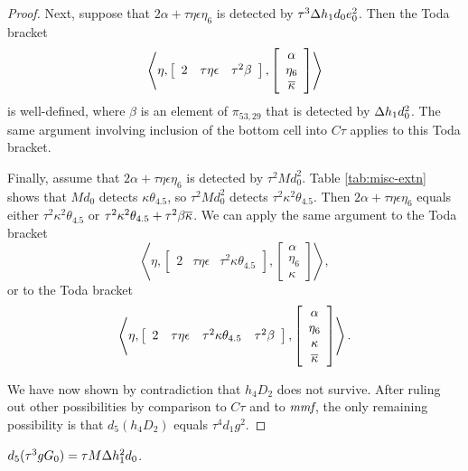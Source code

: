 \begin{proof}
Next, suppose that $2 \alpha + \tau \eta \epsilon \eta_6$
is detected by $\tau^3 \Delta h_1 d_0 e_0^2$.
Then the Toda bracket
\[
\left\langle
\eta,
\left[
\begin{array}{ccc}
2 & \tau \eta \epsilon & \tau^2 \beta
\end{array}
\right],
\left[
\begin{array}{c}
\alpha \\ \eta_6 \\ \overline{\kappa}
\end{array}
\right]
\right\rangle
\]
is well-defined, where $\beta$ is an element of $\pi_{53,29}$
that is detected by $\Delta h_1 d_0^2$.
The same argument involving inclusion of the bottom cell into
$C\tau$ applies to this Toda bracket.

Finally, assume that $2 \alpha + \tau \eta \epsilon \eta_6$
is detected by $\tau^2 M d_0^2$.
Table \ref{tab:misc-extn} shows that $M d_0$ detects
$\kappa \theta_{4.5}$, so $\tau^2 M d_0^2$ detects 
$\tau^2 \kappa^2 \theta_{4.5}$.
Then $2 \alpha + \tau \eta \epsilon \eta_6$ equals either
$\tau^2 \kappa^2 \theta_{4.5}$ or 
$\tau^2 \kappa^2 \theta_{4.5} + \tau^2 \beta \overline{\kappa}$.
We can apply the same argument to the Toda bracket
\[
\left\langle
\eta,
\left[
\begin{array}{ccc}
2 & \tau \eta \epsilon & \tau^2 \kappa \theta_{4.5}
\end{array}
\right],
\left[
\begin{array}{c}
\alpha \\ \eta_6 \\ \kappa
\end{array}
\right]
\right\rangle,
\]
or to the Toda bracket
\[
\left\langle
\eta,
\left[
\begin{array}{cccc}
2 & \tau \eta \epsilon & \tau^2 \kappa \theta_{4.5} & \tau^2 \beta
\end{array}
\right],
\left[
\begin{array}{c}
\alpha \\ \eta_6 \\ \kappa \\ \overline{\kappa}
\end{array}
\right]
\right\rangle.
\]

We have now shown by contradiction that $h_4 D_2$ does not survive.
After ruling out other possibilities by comparison to $C\tau$
and to $\textit{mmf}$, the only remaining possibility is that 
$d_5(h_4 D_2)$ equals $\tau^4 d_1 g^2$.
\end{proof}

\begin{lemma}
\label{lem:d5-t^3gG0}
$d_5(\tau^3 g G_0) = \tau M \Delta h_1^2 d_0$.
\end{lemma}

